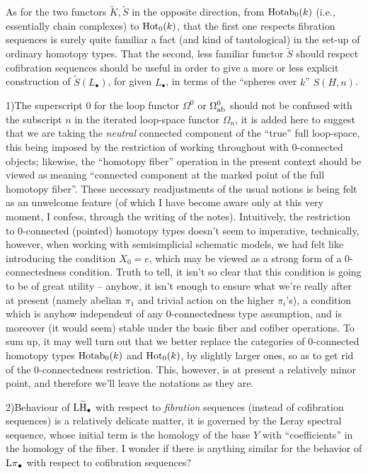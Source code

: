 As for the two functors $\widetilde K,\widetilde S$ in the opposite
direction, from $\operatorname{Hotab}_0(k)$ (i.e., essentially chain complexes) to
$\operatorname{Hot}_0(k)$, that the first one respects fibration sequences is
surely quite familiar a fact (and kind of tautological) in the set-up
of ordinary homotopy types. That the second, less familiar functor
$\widetilde S$ should respect cofibration sequences should
be useful in order to give a more or less explicit construction of
$\widetilde S(L_\bullet)$, for given $L_\bullet$, in terms of the
``spheres over $k$'' $S(H,n)$.

\begin{remarks}
  1)\enspace The superscript $0$ for the loop functor $\Omega^0$ or
  $\Omega_{\mathrm{ab}}^0$ should not be confused with the subscript $n$ in
  the iterated loop-space functor $\Omega_n$, it is added here to
  suggest that we are taking the \emph{neutral} connected component of
  the ``true'' full loop-space, this being imposed by the restriction
  of working throughout with $0$-connected objects; likewise, the
  ``homotopy fiber'' operation in the present context should be viewed
  as meaning ``connected component at the marked point of the full
  homotopy fiber''. These necessary readjustments of the usual notions
  is being felt as an unwelcome feature (of which I have become aware
  only at this very moment, I confess, through the writing of the
  notes). Intuitively, the restriction to $0$-connected (pointed)
  homotopy types doesn't seem to imperative, technically, however,
  when working with semisimplicial schematic models, we had felt like
  introducing the condition $X_0=e$, which may be viewed as a strong
  form of a $0$-connectedness condition. Truth to tell, it isn't so
  clear that this condition is going to be of great utility -- anyhow,
  it isn't enough to ensure what we're really after at present (namely
  abelian $\pi_1$ and trivial action on the higher $\pi_i$'s), a
  condition which is anyhow independent of any $0$-connectedness type
  assumption, and is moreover (it would seem) stable under the basic
  fiber and cofiber operations. To sum up, it may well turn out that
  we better replace the categories of $0$-connected homotopy types
  $\operatorname{Hotab}_0(k)$ and $\operatorname{Hot}_0(k)$, by slightly larger ones, so as to
  get rid of the $0$-connectedness restriction. This, however, is at
  present a relatively minor point, and therefore we'll leave the
  notations as they are.

  2)\enspace Behaviour of $\operatorname{L\widetilde H}_\bullet$ with respect to
  \emph{fibration} sequences (instead of cofibration sequences) is a
  relatively delicate matter, it is governed by the Leray spectral
  sequence, whose initial term is the homology of the base $Y$ with
  ``coefficients'' in the homology of the fiber. I wonder if there is
  anything similar for the behavior of $\operatorname{L\pi}_\bullet$ with respect to
  cofibration sequences?


\end{remarks}

